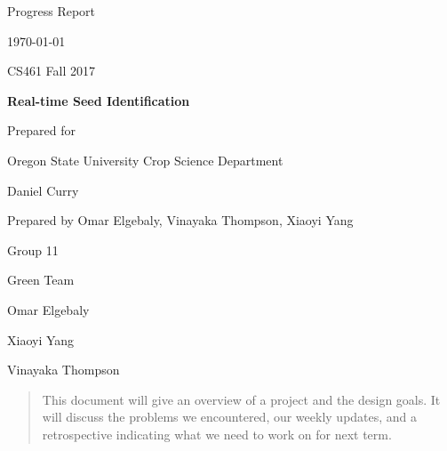 \documentclass[onecolumn, draftclsnofoot,10pt, compsoc]{IEEEtran}
\def \CapstoneTeamName{			Green Team}
\def \CapstoneTeamNumber{		11}
\def \GroupMemberOne{			Omar Elgebaly}
\def \GroupMemberTwo{			Xiaoyi Yang}
\def \GroupMemberThree{			Vinayaka Thompson}
\def \CapstoneProjectName{		Real-time Seed Identification}
\def \CapstoneSponsorCompany{	Oregon State University Crop Science Department}
\def \CapstoneSponsorPerson{	Daniel Curry}
\newcommand{\NameSigPair}[1]{\par
	\makebox[2.75in][r]{#1} \hfil 	\makebox[3.25in]{\makebox[2.25in]{\hrulefill} \hfill		\makebox[.75in]{\hrulefill}}
	\par\vspace{-12pt} \textit{\tiny\noindent
		\makebox[2.75in]{} \hfil		\makebox[3.25in]{\makebox[2.25in][r]{Signature} \hfill	\makebox[.75in][r]{Date}}}}
\renewcommand{\NameSigPair}[1]{#1}
\begin{document}
	\begin{titlepage}
		\begin{singlespace}
			\hfill 
			\par\vspace{.2in}
			\centering
			\scshape{
				\huge Progress Report \par
				{\large\today}\par
				{\large CS461 Fall 2017}\par
				\vspace{.5in}
				\textbf{\Huge\CapstoneProjectName}\par
				\vfill
				{\large Prepared for}\par
				\Huge \CapstoneSponsorCompany\par
				\vspace{5pt}
				{\Large\NameSigPair{\CapstoneSponsorPerson}\par}
				{\large Prepared by Omar Elgebaly, Vinayaka Thompson, Xiaoyi Yang}\par
				Group\CapstoneTeamNumber\par
				\CapstoneTeamName\par 
				\vspace{5pt}
				{\Large
					\NameSigPair{\GroupMemberOne}\par
					\NameSigPair{\GroupMemberTwo}\par
					\NameSigPair{\GroupMemberThree}\par
				}
				\vspace{20pt}
			}
			\begin{abstract}
				This document will give an overview of a project and the design goals. It will discuss the problems we encountered, our weekly updates, and a retrospective indicating what we need to work on for next term.	
				
			\end{abstract}     
		
		\end{singlespace}
	\end{titlepage}
	\newpage
	\tableofcontents
	\clearpage
	
\end{document}
